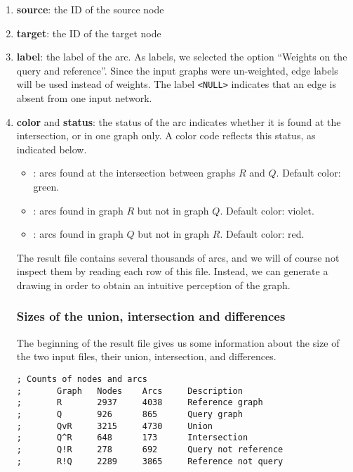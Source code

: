 \begin{enumerate}
\item \textbf{source}: the ID of the source node
  
\item \textbf{target}: the ID of the target node
  
\item \textbf{label}: the label of the arc. As labels, we selected
  the option ``Weights on the query and reference''. Since the
  input graphs were un-weighted, edge labels will be used instead
  of weights. The label \texttt{<NULL>} indicates that an edge is
  absent from one input network.
  
\item \textbf{color} and \textbf{status}: the status of the arc
  indicates whether it is found at the intersection, or in one graph
  only.  A color code reflects this status, as indicated below.
  \begin{itemize}
  \item {}: arcs found at the intersection between graphs $R$
    and $Q$. Default color: green.
  \item {}: arcs found in graph $R$ but not in graph
    $Q$. Default color: violet.
  \item {}: arcs found in graph $Q$ but not in graph
    $R$. Default color: red.
  \end{itemize}

  The result file contains several thousands of arcs, and we will of
  course not inspect them by reading each row of this file. Instead,
  we can generate a drawing in order to obtain an intuitive perception
  of the graph.

\subsubsection{Sizes of the union, intersection and differences}

The beginning of the result file gives us some information about the
size of the two input files, their union, intersection, and
differences.

\begin{footnotesize}
\begin{verbatim}
; Counts of nodes and arcs
;       Graph   Nodes    Arcs     Description
;       R       2937     4038     Reference graph
;       Q       926      865      Query graph
;       QvR     3215     4730     Union
;       Q^R     648      173      Intersection
;       Q!R     278      692      Query not reference
;       R!Q     2289     3865     Reference not query
\end{verbatim}
\end{footnotesize}


\end{enumerate}
